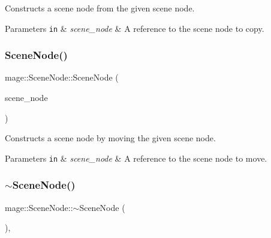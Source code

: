 Constructs a scene node from the given scene node.


\begin{DoxyParams}[1]{Parameters}
\mbox{\tt in}  & {\em scene\+\_\+node} & A reference to the scene node to copy. \\
\hline
\end{DoxyParams}
\hypertarget{classmage_1_1_scene_node_acbf94ceadac62f2ccde13d70ce9298d7}{}\label{classmage_1_1_scene_node_acbf94ceadac62f2ccde13d70ce9298d7} 
\subsubsection{\texorpdfstring{Scene\+Node()}{SceneNode()}\hspace{0.1cm}{\footnotesize\ttfamily [3/3]}}
{\footnotesize\ttfamily mage\+::\+Scene\+Node\+::\+Scene\+Node (\begin{DoxyParamCaption}\item[{\hyperlink{classmage_1_1_scene_node}{Scene\+Node} \&\&}]{scene\+\_\+node }\end{DoxyParamCaption})\hspace{0.3cm}{\ttfamily [default]}}

Constructs a scene node by moving the given scene node.


\begin{DoxyParams}[1]{Parameters}
\mbox{\tt in}  & {\em scene\+\_\+node} & A reference to the scene node to move. \\
\hline
\end{DoxyParams}
\hypertarget{classmage_1_1_scene_node_a6705beea9c535de3d495762ed06e74dd}{}\label{classmage_1_1_scene_node_a6705beea9c535de3d495762ed06e74dd} 
\subsubsection{\texorpdfstring{$\sim$\+Scene\+Node()}{~SceneNode()}}
{\footnotesize\ttfamily mage\+::\+Scene\+Node\+::$\sim$\+Scene\+Node (\begin{DoxyParamCaption}{ }\end{DoxyParamCaption})\hspace{0.3cm}{\ttfamily [virtual]}, {\ttfamily [default]}}

